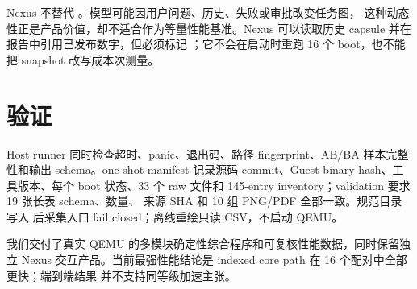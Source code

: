 Nexus 不替代 。模型可能因用户问题、历史、失败或审批改变任务图，
这种动态性正是产品价值，却不适合作为等量性能基准。Nexus 可以读取历史
 capsule 并在报告中引用已发布数字，但必须标记
；它不会在启动时重跑 16 个 boot，也不能把 snapshot
改写成本次测量。

\section{验证}

Host runner 同时检查超时、panic、退出码、路径 fingerprint、AB/BA 样本完整性和输出
schema。one-shot manifest 记录源码 commit、Guest binary hash、工具版本、每个 boot
状态、33 个 raw 文件和 145-entry inventory；validation 要求 19 张长表 schema、数量、
来源 SHA 和 10 组 PNG/PDF 全部一致。规范目录写入  后采集入口 fail
closed；离线重绘只读 CSV，不启动 QEMU。

\begin{evidencebox}[任务六结论]
我们交付了真实 QEMU 的多模块确定性综合程序和可复核性能数据，同时保留独立 Nexus
交互产品。当前最强性能结论是 indexed core path 在 16 个配对中全部更快；端到端结果
并不支持同等级加速主张。
\end{evidencebox}
